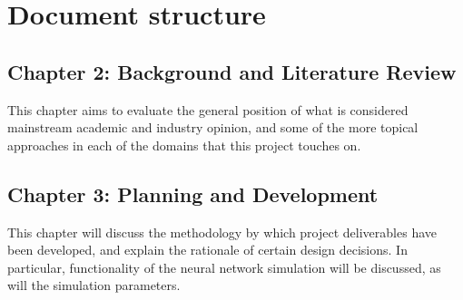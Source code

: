 


%

\section{Document structure}

\subsection*{Chapter 2: Background and Literature Review}
This chapter aims to evaluate the general position of what is considered
mainstream academic and industry opinion, and some of the more topical
approaches in each of the domains that this project touches on.

\subsection*{Chapter 3: Planning and Development}
This chapter will discuss the methodology by which project deliverables have
been developed, and explain the rationale of certain design decisions. In
particular, functionality of the neural network simulation will be discussed, as
will the simulation parameters.

